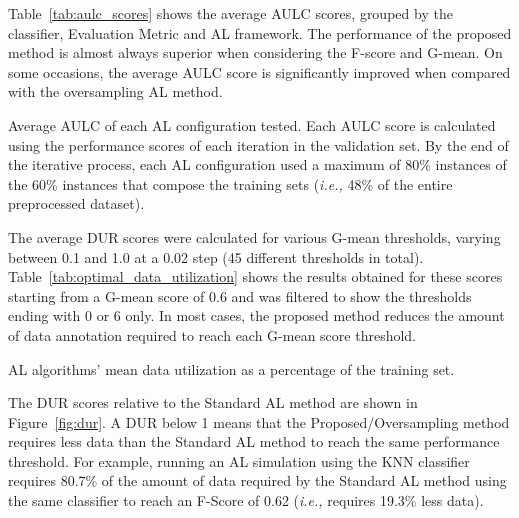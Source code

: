 \documentclass[parskip=full]{scrartcl}
\begin{document}
Table~\ref{tab:aulc_scores} shows the average AULC scores, grouped by the
classifier, Evaluation Metric and AL framework. The performance of the
proposed method is almost always superior when considering the F-score and
G-mean. On some occasions, the average AULC score is significantly improved
when compared with the oversampling AL method.

\begin{table}[H]
	\centering
    \setlength{\tabcolsep}{2.5pt}
    \caption{\label{tab:aulc_scores}
        Average AULC of each AL configuration tested. Each AULC score is
        calculated using the performance scores of each iteration in the
        validation set. By the end of the iterative process, each AL
        configuration used a maximum of 80\% instances of the 60\% instances
        that compose the training sets (\textit{i.e.,} 48\% of the entire
        preprocessed dataset).
    }
\end{table}

The average DUR scores were calculated for various G-mean thresholds, varying
between 0.1 and 1.0 at a 0.02 step (45 different thresholds in total).
Table~\ref{tab:optimal_data_utilization} shows the results obtained for these
scores starting from a G-mean score of 0.6 and was filtered to show the
thresholds ending with 0 or 6 only. In most cases, the proposed method reduces
the amount of data annotation required to reach each G-mean score threshold.

\begin{table}[H]
    \centering
    \setlength{\tabcolsep}{2.5pt}
    \caption{\label{tab:optimal_data_utilization}
        AL algorithms' mean data utilization as a percentage of the
        training set.
    }
\end{table}

The DUR scores relative to the Standard AL method are shown in
Figure~\ref{fig:dur}. A DUR below 1 means that the Proposed/Oversampling
method requires less data than the Standard AL method to reach the same
performance threshold. For example, running an AL simulation using the KNN
classifier requires 80.7\% of the amount of data required by the Standard AL
method using the same classifier to reach an F-Score of 0.62 (\textit{i.e.,}
requires 19.3\% less data).
\end{document}
